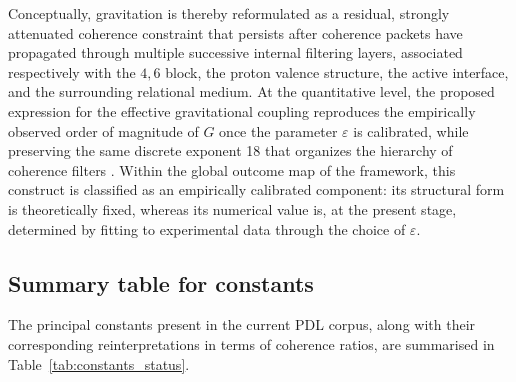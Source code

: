 \documentclass{article}
\begin{document}
Conceptually, gravitation is thereby reformulated as a residual, strongly attenuated coherence constraint that persists after coherence packets have propagated through multiple successive internal filtering layers, associated respectively with the \(4,6\) block, the proton valence structure, the active interface, and the surrounding relational medium. At the quantitative level, the proposed expression for the effective gravitational coupling reproduces the empirically observed order of magnitude of \(G\) once the parameter \(\varepsilon\) is calibrated, while preserving the same discrete exponent 18 that organizes the hierarchy of coherence filters
\citep{Exponent_18_PDL_2026,Coherence_Leakage_18_2026}. Within the global outcome map of the framework, this construct is classified as an empirically calibrated component: its structural form is theoretically fixed, whereas its numerical value is, at the present stage, determined by fitting to experimental data through the choice of \(\varepsilon\).

\subsection{Summary table for constants}
\label{subsec:constants_table}

The principal constants present in the current PDL corpus, along with their corresponding reinterpretations in terms of coherence ratios, are summarised in Table~\ref{tab:constants_status}.

\setlength{\LTpre}{18pt}
\setlength{\LTpost}{0pt}
\end{document}
